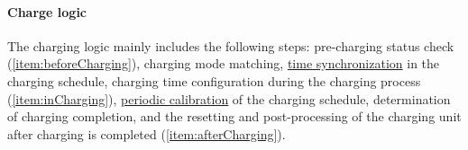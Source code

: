 \documentclass[
english,
ruledheaders=section,%
class=report,%
thesis={type=Report},%
accentcolor=9c,%
custommargins=true,%
marginpar=false,%
parskip=half-,%
fontsize=11pt,%
logofile={img/tuda_logo.pdf}, %
]{tudapub}
\begin{document}
    \paragraph{Charge logic}
    \label{para:chargeLogic}

    The charging logic mainly includes the following steps: pre-charging status check (\ref{item:beforeCharging}), charging mode matching, \hyperref[para:timeSynchronAndSplit]{time synchronization} in the charging schedule, charging time configuration during the charging process (\ref{item:inCharging}), \hyperref[para:chargePlanCalibration]{periodic calibration} of the charging schedule, determination of charging completion, and the resetting and post-processing of the charging unit after charging is completed (\ref{item:afterCharging}).
\end{document}
